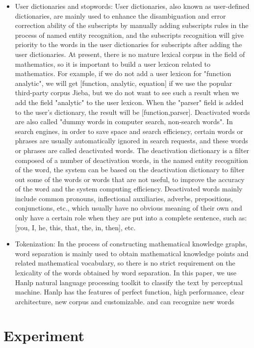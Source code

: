 \begin{itemize}
	\item User dictionaries and stopwords: User dictionaries, also known as user-defined dictionaries, are mainly used to enhance the disambiguation and error correction ability of the subscripts by manually adding subscripts rules in the process of named entity recognition, and the subscripts recognition will give priority to the words in the user dictionaries for subscripts after adding the user dictionaries. At present, there is no mature lexical corpus in the field of mathematics, so it is important to build a user lexicon related to mathematics. For example, if we do not add a user lexicon for "function analytic", we will get [function, analytic, equation] if we use the popular third-party corpus Jieba, but we do not want to see such a result when we add the field "analytic" to the user lexicon. When the "parser" field is added to the user's dictionary, the result will be [function,parser]. Deactivated words are also called "dummy words in computer search, non-search words". In search engines, in order to save space and search efficiency, certain words or phrases are usually automatically ignored in search requests, and these words or phrases are called deactivated words. The deactivation dictionary is a filter composed of a number of deactivation words, in the named entity recognition of the word, the system can be based on the deactivation dictionary to filter out some of the words or words that are not useful, to improve the accuracy of the word and the system computing efficiency. Deactivated words mainly include common pronouns, inflectional auxiliaries, adverbs, prepositions, conjunctions, etc., which usually have no obvious meaning of their own and only have a certain role when they are put into a complete sentence, such as: [you, I, he, this, that, the, in, then], etc.
	\item Tokenization: In the process of constructing mathematical knowledge graphs, word separation is mainly used to obtain mathematical knowledge points and related mathematical vocabulary, so there is no strict requirement on the lexicality of the words obtained by word separation. In this paper, we use Hanlp natural language processing toolkit to classify the text by perceptual machine. Hanlp has the features of perfect function, high performance, clear architecture, new corpus and customizable. and can recognize new words
\end{itemize}

\section{Experiment}


